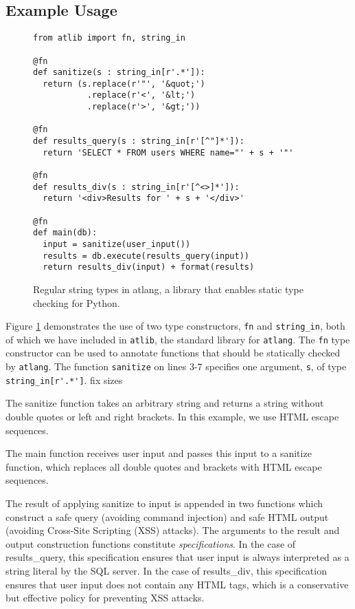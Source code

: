 \documentclass[9pt]{sig-alternate}
\newcommand{\todo}[1]{{\color{red} #1}}
\theoremstyle{definition}
\begin{document}
\subsection{Example Usage}

\begin{figure}[h]\begin{lstlisting}
from atlib import fn, string_in

@fn
def sanitize(s : string_in[r'.*']):
  return (s.replace(r'"', '&quot;') 
           .replace(r'<', '&lt;')
           .replace(r'>', '&gt;'))

@fn
def results_query(s : string_in[r'[^"]*']):
  return 'SELECT * FROM users WHERE name="' + s + '"'

@fn
def results_div(s : string_in[r'[^<>]*']):
  return '<div>Results for ' + s + '</div>'

@fn
def main(db):
  input = sanitize(user_input())
  results = db.execute(results_query(input))
  return results_div(input) + format(results)
\end{lstlisting}
\vspace{-10px}
\caption{Regular string types in atlang, a library that enables static type checking for Python. }\label{fig:atexample}
\end{figure}



Figure \ref{fig:atexample} demonstrates the use of two type constructors, \verb|fn| and \verb|string_in|, both of which we have included in \verb|atlib|, the standard library for \verb|atlang|. The \verb|fn| type constructor can be used to annotate functions that should be statically checked by \verb|atlang|. The function \verb|sanitize| on lines 3-7 specifies one argument, \verb|s|, of type \lstinline{string_in[r'.*']}.\todo{fix sizes}

The sanitize function takes an arbitrary string and returns a string without
double quotes or left and right brackets. In this example, we use HTML
escape sequences.

The main function receives user input and passes this input to a 
sanitize function, which replaces all double quotes and brackets with HTML
escape sequences. 

The result of applying sanitize to input is appended in two functions which
construct a safe query (avoiding command injection) and safe HTML output (avoiding Cross-Site Scripting (XSS) attacks).
The arguments to the result and output construction functions constitute \emph{specifications}.
In the case of \textsf{results_query}, this specification ensures that user input is always interpreted
as a string literal by the SQL server.
In the case of \textsf{results_div}, this specification ensures that user input does 
not contain any HTML tags, which is a conservative but effective policy for preventing XSS attacks.
\end{document}
